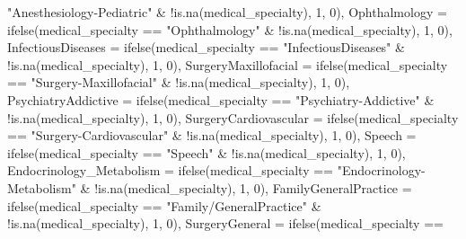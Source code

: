 \documentclass[
]{article}
\newenvironment{Shaded}{\begin{snugshade}}{\end{snugshade}}
\newcommand{\AttributeTok}[1]{\textcolor[rgb]{0.77,0.63,0.00}{#1}}
\newcommand{\DecValTok}[1]{\textcolor[rgb]{0.00,0.00,0.81}{#1}}
\newcommand{\FunctionTok}[1]{\textcolor[rgb]{0.00,0.00,0.00}{#1}}
\newcommand{\NormalTok}[1]{#1}
\newcommand{\SpecialCharTok}[1]{\textcolor[rgb]{0.00,0.00,0.00}{#1}}
\newcommand{\StringTok}[1]{\textcolor[rgb]{0.31,0.60,0.02}{#1}}
\begin{document}
\begin{Shaded}
\begin{Highlighting}[]
        \StringTok{"Anesthesiology{-}Pediatric"} \SpecialCharTok{\&} \SpecialCharTok{!}\FunctionTok{is.na}\NormalTok{(medical\_specialty),}
        \DecValTok{1}\NormalTok{, }\DecValTok{0}\NormalTok{), }\AttributeTok{Ophthalmology =} \FunctionTok{ifelse}\NormalTok{(medical\_specialty }\SpecialCharTok{==}
        \StringTok{"Ophthalmology"} \SpecialCharTok{\&} \SpecialCharTok{!}\FunctionTok{is.na}\NormalTok{(medical\_specialty),}
        \DecValTok{1}\NormalTok{, }\DecValTok{0}\NormalTok{), }\AttributeTok{InfectiousDiseases =} \FunctionTok{ifelse}\NormalTok{(medical\_specialty }\SpecialCharTok{==}
        \StringTok{"InfectiousDiseases"} \SpecialCharTok{\&} \SpecialCharTok{!}\FunctionTok{is.na}\NormalTok{(medical\_specialty),}
        \DecValTok{1}\NormalTok{, }\DecValTok{0}\NormalTok{), }\AttributeTok{SurgeryMaxillofacial =} \FunctionTok{ifelse}\NormalTok{(medical\_specialty }\SpecialCharTok{==}
        \StringTok{"Surgery{-}Maxillofacial"} \SpecialCharTok{\&} \SpecialCharTok{!}\FunctionTok{is.na}\NormalTok{(medical\_specialty),}
        \DecValTok{1}\NormalTok{, }\DecValTok{0}\NormalTok{), }\AttributeTok{PsychiatryAddictive =} \FunctionTok{ifelse}\NormalTok{(medical\_specialty }\SpecialCharTok{==}
        \StringTok{"Psychiatry{-}Addictive"} \SpecialCharTok{\&} \SpecialCharTok{!}\FunctionTok{is.na}\NormalTok{(medical\_specialty),}
        \DecValTok{1}\NormalTok{, }\DecValTok{0}\NormalTok{), }\AttributeTok{SurgeryCardiovascular =} \FunctionTok{ifelse}\NormalTok{(medical\_specialty }\SpecialCharTok{==}
        \StringTok{"Surgery{-}Cardiovascular"} \SpecialCharTok{\&} \SpecialCharTok{!}\FunctionTok{is.na}\NormalTok{(medical\_specialty),}
        \DecValTok{1}\NormalTok{, }\DecValTok{0}\NormalTok{), }\AttributeTok{Speech =} \FunctionTok{ifelse}\NormalTok{(medical\_specialty }\SpecialCharTok{==}
        \StringTok{"Speech"} \SpecialCharTok{\&} \SpecialCharTok{!}\FunctionTok{is.na}\NormalTok{(medical\_specialty), }\DecValTok{1}\NormalTok{, }\DecValTok{0}\NormalTok{),}
        \AttributeTok{Endocrinology\_Metabolism =} \FunctionTok{ifelse}\NormalTok{(medical\_specialty }\SpecialCharTok{==}
            \StringTok{"Endocrinology{-}Metabolism"} \SpecialCharTok{\&} \SpecialCharTok{!}\FunctionTok{is.na}\NormalTok{(medical\_specialty),}
            \DecValTok{1}\NormalTok{, }\DecValTok{0}\NormalTok{), }\AttributeTok{FamilyGeneralPractice =} \FunctionTok{ifelse}\NormalTok{(medical\_specialty }\SpecialCharTok{==}
            \StringTok{"Family/GeneralPractice"} \SpecialCharTok{\&} \SpecialCharTok{!}\FunctionTok{is.na}\NormalTok{(medical\_specialty),}
            \DecValTok{1}\NormalTok{, }\DecValTok{0}\NormalTok{), }\AttributeTok{SurgeryGeneral =} \FunctionTok{ifelse}\NormalTok{(medical\_specialty }\SpecialCharTok{==}

\end{Highlighting}
\end{Shaded}
\end{document}
